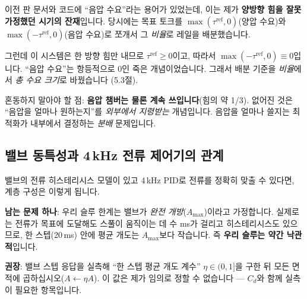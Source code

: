 \documentclass[11pt]{article}
\begin{document}
이전 판 문서와 코드에 ``음압 수요''라는 용어가 있었는데, 이는 제가 \textbf{양방향 힘을
잘못 가정했던 시기의 잔재}입니다. 당시에는 목표 토크를
$\max(\tau^{\mathrm{ref}},0)$(양압 수요)와 $\max(-\tau^{\mathrm{ref}},0)$(음압 수요)로
쪼개서 그 \emph{비율}로 레일을 배분했습니다.

그런데 이 시스템은 한 방향 힘만 내므로 $\tau^{\mathrm{ref}}\ge0$이고, 따라서
$\max(-\tau^{\mathrm{ref}},0)\equiv0$입니다. ``음압 수요''는 항등적으로 0인 죽은
개념이었습니다. 그래서 배분 기준을 \emph{비율}에서 \emph{총 수요 크기}로 바꿨습니다
(5.3절).

\begin{keybox}
혼동하지 말아야 할 점: \textbf{음압 챔버는 물론 계속 쓰입니다}(힘의 약 1/3). 없어진
것은 ``음압을 얼마나 원하는지''를 \emph{외부에서 지령받는} 개념입니다. 음압을 얼마나
쓸지는 최적화가 내부에서 결정하는 \emph{분배} 문제입니다.
\end{keybox}

\subsection{밸브 동특성과 4\,kHz 전류 제어기의 관계}

밸브의 전류 히스테리시스 모델이 있고 4\,kHz PID로 전류를 정확히 맞출 수 있다면, 계층
구성은 이렇게 됩니다.
\begin{center}
\end{center}

\begin{pitfall}
\textbf{남는 문제 하나}: 우리 슬루 한계는 밸브가 \emph{완전 개방}($A_{\max}$)이라고
가정합니다. 실제로는 전류가 목표에 도달해도 스풀이 움직이는 데 수 ms가 걸리고
히스테리시스도 있으므로, 한 스텝(20\,ms) 안에 평균 개도는 $A_{\max}$보다 작습니다.
즉 \textbf{우리 슬루는 약간 낙관적}입니다.

\textbf{권장}: 밸브 스텝 응답을 실측해 ``한 스텝 평균 개도 계수'' $\eta\in(0,1]$을 구한
뒤 모든 면적에 곱하십시오($A\leftarrow\eta A$). 이 값은 제가 임의로 정할 수 없습니다 ---
$C_d$와 함께 실측이 필요한 항목입니다.
\end{pitfall}
\end{document}
